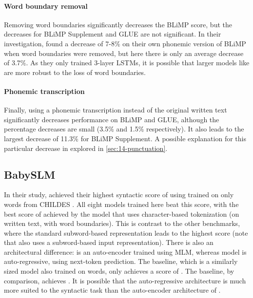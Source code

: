 \paragraph{Word boundary removal} Removing word boundaries significantly decreases the BLiMP score, but the decreases for BLiMP Supplement and GLUE are not significant. In their investigation, \citet{nguyen-2022-word-boundaries} found a decrease of 7-8\% on their own phonemic version of BLiMP when word boundaries were removed, but here there is only an average decrease of 3.7\%. As they only trained 3-layer LSTMs, it is possible that larger models like \gpt are more robust to the loss of word boundaries.

\paragraph{Phonemic transcription} Finally, using a phonemic transcription instead of the original written text significantly decreases performance on BLiMP and GLUE, although the percentage decreases are small (3.5\% and 1.5\% respectively). It also leads to the largest decrease of 11.3\% for BLiMP Supplement. A possible explanation for this particular decrease in explored in \cref{sec:14-punctuation}.

\subsection{BabySLM}
\label{sec:14-babyslm}

In their study, \citet{lavechin} achieved their highest syntactic score of  using \babyberta \citep{huebner-etal-2021-babyberta} trained on only  words from CHILDES \citep{macwhinney1985child}. All eight \gpt models trained here beat this score, with the best score of  achieved by the model that uses character-based tokenization (on written text, with word boundaries). This is contrast to the other benchmarks, where the standard subword-based representation leads to the highest score (note that \babyberta also uses a subword-based input representation). There is also an architectural difference: \babyberta is an auto-encoder trained using MLM, whereas \gpt model is auto-regressive, using next-token prediction. The  baseline, which is a similarly sized model also trained on  words, only achieves a score of . The  baseline, by comparison, achieves . It is possible that the auto-regressive architecture is much more suited to the syntactic task than the auto-encoder architecture of \bert. 

